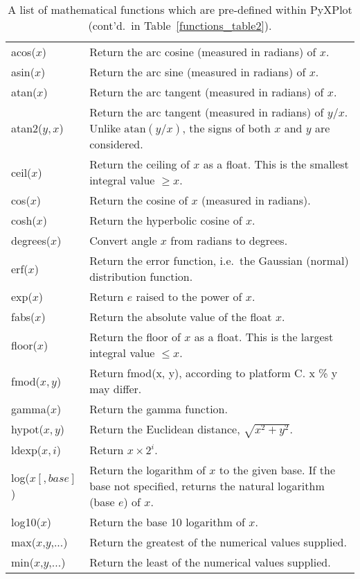 \begin{table}
\begin{tabular}{|lp{8cm}|}
\hline
acos($x$)&
Return the arc cosine (measured in radians) of $x$.\\
asin($x$)&
Return the arc sine (measured in radians) of $x$.\\
atan($x$)&
Return the arc tangent (measured in radians) of $x$.\\
atan2($y,x$)&
Return the arc tangent (measured in radians) of $y/x$. Unlike $\mathrm{atan}(y/x)$, the signs of both $x$ and $y$ are considered.\\
ceil($x$)&
Return the ceiling of $x$ as a float. This is the smallest integral value $\geq x$.\\
cos($x$)&
Return the cosine of $x$ (measured in radians).\\
cosh($x$)&
Return the hyperbolic cosine of $x$.\\
degrees($x$)&
Convert angle $x$ from radians to degrees.\\
erf($x$)&
Return the error function, i.e.\ the Gaussian (normal) distribution function.\\
exp($x$)&
Return $e$ raised to the power of $x$.\\
fabs($x$)&
Return the absolute value of the float $x$.\\
floor($x$)&
Return the floor of $x$ as a float. This is the largest integral value $\leq x$.\\
fmod($x,y$)&
Return fmod(x, y), according to platform C.  x \% y may differ.\\
gamma($x$)&
Return the gamma function.\\
hypot($x,y$)&
Return the Euclidean distance, $\sqrt{x^2 + y^2}$.\\
ldexp($x, i$)&
Return $x \times 2^i$. \\
log($x[,base]$)&
Return the logarithm of $x$ to the given base. If the base not specified, returns the natural logarithm (base $e$) of $x$.\\
log10($x$)&
Return the base 10 logarithm of $x$.\\
max($x$,$y$,...)&
Return the greatest of the numerical values supplied.\\
min($x$,$y$,...)&
Return the least of the numerical values supplied.\\
\hline
\end{tabular}
\caption{A list of mathematical functions which are pre-defined within PyXPlot (cont'd.\ in Table~\ref{functions_table2}).}
\label{functions_table}
\end{table}

